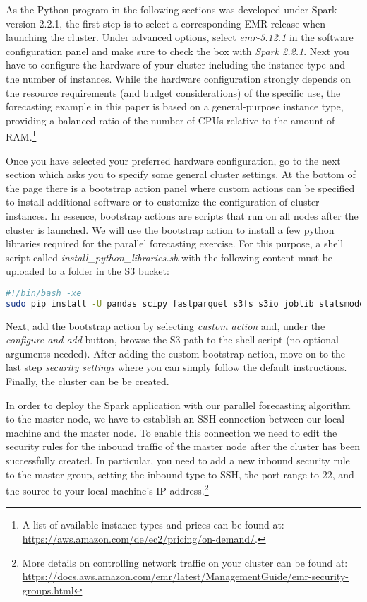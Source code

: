 \documentclass[11pt]{article}
\begin{document}
As the Python program in the following sections was developed under Spark version 2.2.1, the first step is to select a corresponding EMR release when launching the cluster. Under advanced options, select \emph{emr-5.12.1} in the software configuration panel and make sure to check the box with \emph{Spark 2.2.1}. Next you have to configure the hardware of your cluster including the instance type and the number of instances. While the hardware configuration strongly depends on the resource requirements (and budget considerations) of the specific use, the forecasting example in this paper is based on a general-purpose instance type, providing a balanced ratio of the number of CPUs relative to the amount of RAM.\footnote{A list of available instance types and prices can be found at: \url{https://aws.amazon.com/de/ec2/pricing/on-demand/}.}

Once you have selected your preferred hardware configuration, go to the next section which asks you to specify some general cluster settings. At the bottom of the page there is  a bootstrap action panel where custom actions can be specified to install additional software or to customize the configuration of cluster instances. In essence, bootstrap actions are scripts that run on all nodes after the cluster is launched. We will use the bootstrap action to install a few python libraries required for the parallel forecasting exercise. For this purpose, a shell script called \emph{install\_python\_libraries.sh} with the following content must be uploaded to a folder in the S3 bucket:

\begin{lstlisting}[language=bash, backgroundcolor=\color{yellow!20}, caption={\emph{install\_python\_libraries.sh}}]
#!/bin/bash -xe
sudo pip install -U pandas scipy fastparquet s3fs s3io joblib statsmodels
\end{lstlisting}
Next, add the bootstrap action by selecting \emph{custom action} and, under the \emph{configure and add} button, browse the S3 path to the shell script (no optional arguments needed). After adding the custom bootstrap action, move on to the last step \emph{security settings} where you can simply follow the default instructions. Finally, the cluster can be be created.

In order to deploy the Spark application with our parallel forecasting algorithm to the master node, we have to establish an SSH connection between our local machine and the master node. To enable this connection we need to edit the security rules for the inbound traffic of the master node after the cluster has been successfully created. In particular, you need to add a new inbound security rule to the master group, setting the inbound type to SSH, the port range to 22, and the source to your local machine's IP address.\footnote{More details on controlling network traffic on your cluster can be found at: \url{https://docs.aws.amazon.com/emr/latest/ManagementGuide/emr-security-groups.html}}  
\end{document}
